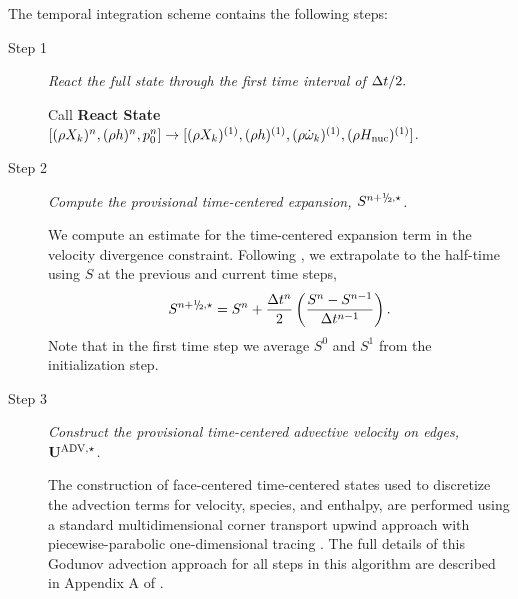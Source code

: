 The temporal integration scheme contains the following steps:
\begin{description}

\item[Step 1] {\em React the full state through the first time interval of $\Delta t / 2.$}

Call {\bf React State}$[(\rho X_k)^n, (\rho h)^n, p_0^n] \rightarrow [(\rho X_k)^{(1)}, (\rho h)^{(1)}, (\rho \dot\omega_k)^{(1)}, (\rho H_{\rm nuc})^{(1)}]$.


\item[Step 2] {\em Compute the provisional time-centered expansion,
    $S^{\nph,\star}$.}

We compute an estimate for the time-centered expansion term in the velocity
divergence constraint.  Following \citet{Bell:2004}, we extrapolate
to the half-time using $S$ at the previous and current
time steps,
\begin{equation}
S^{\nph,\star} = S^n + \frac{\dt^n}{2} \left(\frac{S^n - S^{n-1}}{\dt^{n-1}}\right).
\end{equation}
Note that in the first time step we average $S^0$ and $S^1$ from the
initialization step.

\item[Step 3] {\em Construct the provisional time-centered advective velocity on
edges, ${\bf{U}}^{\mathrm{ADV},\star}$.}

The construction of face-centered time-centered states used to discretize the
advection terms for velocity, species, and enthalpy, are performed using
a standard multidimensional corner transport upwind approach
\citep{colella1990multidimensional,saltzman1994unsplit} with piecewise-parabolic
one-dimensional tracing \citep{colella1984piecewise}.  The full details of this
Godunov advection approach for all steps in this algorithm are described 
in Appendix A of \cite{XRB_III}.


\end{description}
